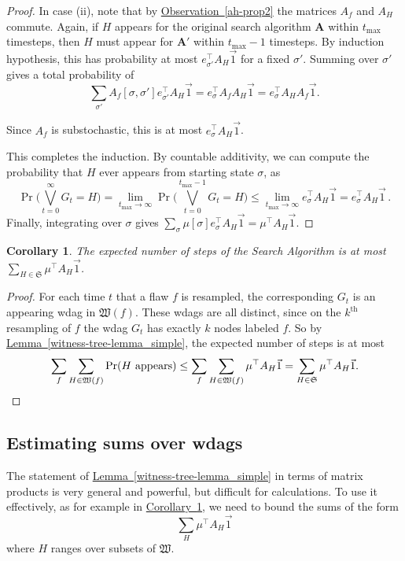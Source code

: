\documentclass[11pt]{article}
\newcommand{\expref}[2]{\texorpdfstring{\hyperref[#2]{#1~\ref{#2}}}{#1~\ref{#2}}}
\newtheorem{corollary}[theorem]{Corollary}
\begin{document}
\begin{proof}
In case (ii), note that by \expref{Observation}{ah-prop2} the matrices $A_f$ and $A_H$ commute. Again, if $H$ appears for the original search algorithm $\mathbf A$ within $t_{\max}$ timesteps, then   $H$ must appear for $\mathbf A'$ within $t_{\max}-1$ timesteps. By induction hypothesis, this has  probability at most $e_{\sigma'}^{\top} A_H \vec 1$ for a fixed $\sigma'$. Summing over $\sigma'$ gives a total probability of 
$$
\sum_{\sigma'} A_f[\sigma, \sigma'] e_{\sigma'}^{\top} A_{H} \vec 1 = e_{\sigma}^{\top} A_f  A_{H} \vec 1 = e_{\sigma}^{\top} A_H A_f \vec 1.
$$

Since $A_f$ is substochastic, this is at most $e_{\sigma}^{\top} A_H \vec 1$.

This completes the induction. By countable additivity, we can compute the probability that $H$ ever appears from starting state $\sigma$, as 
$$
\Pr \bigl( \bigvee_{t=0}^{\infty} G_t = H \bigr)= \lim_{t_{\max} \rightarrow \infty} \Pr \bigl( \bigvee_{t=0}^{t_{\max}-1} G_t = H \bigr) \leq  \lim_{t_{\max} \rightarrow \infty} e_{\sigma}^{\top} A_H \vec 1 = e_{\sigma}^{\top} A_H \vec 1\,.
$$
Finally, integrating over $\sigma$ gives $\sum_{\sigma} \mu[\sigma] e_{\sigma}^{\top} A_H \vec 1 =  \mu^{\top} A_H \vec 1$.
\end{proof}



\begin{corollary}
\label{stepscor}
The expected number of steps of the Search Algorithm is at most $ \sum_{H \in \mathfrak S} \mu^{\top} A_H \vec 1$. 
\end{corollary}
\begin{proof}
  For each time $t$ that a flaw  $f$ is resampled, the corresponding $G_t$ is an appearing wdag in $\mathfrak W(f)$. These wdags are all  distinct, since on the $k^{\text{th}}$ resampling of $f$ the wdag $G_t$ has exactly $k$ nodes labeled $f$. So by
%
%
\expref{Lemma}{witness-tree-lemma_simple},   %
%
the expected number of steps is at most \[
\sum_f \sum_{H \in \mathfrak W(f)} \Pr(\text{$H$ appears}) \leq \sum_f \sum_{H \in \mathfrak W(f)} \mu^{\top} A_H \vec 1 = \sum_{H \in \mathfrak S} \mu^{\top} A_H \vec 1. \qedhere
\]
\end{proof}


\subsection{Estimating sums over wdags}
\label{sec-est}
The statement of \expref{Lemma}{witness-tree-lemma_simple} 
in terms of matrix products is very general and powerful, but difficult for calculations.  To use it effectively, as for example in \expref{Corollary}{stepscor}, we need to bound the sums of the form
$$
  \sum_{H}  \mu^{\top} A_H \vec 1
$$
where $H$ ranges over subsets of $\mathfrak W$. 
\end{document}
